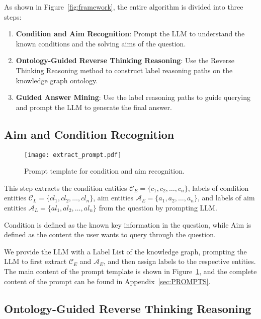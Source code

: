 As shown in Figure~\ref{fig:framework}, the entire algorithm is divided into three steps:

\begin{enumerate}
    \item \textbf{Condition and Aim Recognition}: Prompt the LLM to understand the known conditions and the solving aims of the question.
    \item \textbf{Ontology-Guided Reverse Thinking Reasoning}:  Use the Reverse Thinking Reasoning method to construct label reasoning paths on the knowledge graph ontology.
    \item \textbf{Guided Answer Mining}: Use the label reasoning paths to guide querying and prompt the LLM to generate the final answer.
\end{enumerate}

\subsection{Aim and Condition Recognition}

\begin{figure}[htbp]
  \centering
  \texttt{[image: extract\_prompt.pdf]}  %
  \caption{Prompt template for condition and aim recognition.}  %
  \label{fig:extract_prompt}  %
\end{figure}

This step extracts the condition entities \( \mathcal{C}_E = \{c_1, c_2, \dots, c_n\} \), labels of condition entities \( \mathcal{C}_L = \{cl_1, cl_2, \dots, cl_n\} \), aim entities \( \mathcal{A}_E = \{a_1, a_2, \dots, a_n\} \), and labels of aim entities \( \mathcal{A}_L = \{al_1, al_2, \dots, al_n\} \) from the question by prompting LLM. 

Condition is defined as the known key information in the question, while Aim is defined as the content the user wants to query through the question. 

We provide the LLM with a Label List of the knowledge graph, prompting the LLM to first extract \( \mathcal{C}_E \) and \( \mathcal{A}_E \), and then assign labels to the respective entities. The main content of the prompt template is shown in Figure~\ref{fig:extract_prompt}, and the complete content of the prompt can be found in Appendix~\ref{sec:PROMPTS}.

\subsection{Ontology-Guided Reverse Thinking Reasoning}

